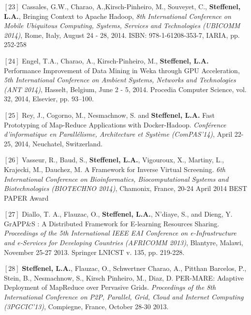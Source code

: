 \documentclass[final,twoside]{hdr} %
\begin{document}
\vspace{1em} \noindent $[23]$
Cassales, G.W., Charao, A.,Kirsch-Pinheiro, M., Souveyet, C., {\bf Steffenel, L.A.}, {Bringing Context to Apache Hadoop}, {\em 8th International Conference on Mobile Ubiquitous Computing, Systems, Services and Technologies (UBICOMM 2014)}, Rome, Italy, August 24 - 28, 2014. ISBN: 978-1-61208-353-7, IARIA, pp. 252-258 

\vspace{1em} \noindent $[24]$
Engel, T.A., Charao, A., Kirsch-Pinheiro, M., {\bf Steffenel, L.A.} {Performance Improvement of Data Mining in Weka through GPU Acceleration}, {\em 5th International Conference on Ambient Systems, Networks and Technologies (ANT 2014)}, Hasselt, Belgium, June 2 - 5, 2014. Procedia Computer Science, vol. 32, 2014, Elsevier, pp. 93–100.  

\vspace{1em} \noindent $[25]$
Rey, J., Cogorno, M., Nesmachnow, S. and {\bf Steffenel, L.A.} {Fast Prototyping of Map-Reduce Applications with Docker-Hadoop}. {\em Conférence d’informatique en Parallélisme, Architecture et Système (ComPAS'14)}, April 22-25, 2014, Neuchatel, Switzerland.

\vspace{1em} \noindent $[26]$
Vasseur, R., Baud, S., {\bf Steffenel, L.A.}, Vigouroux, X., Martiny, L., Krajecki, M., Dauchez, M. {A Framework for Inverse Virtual Screening}. {\em 6th International Conference on Bioinformatics, Biocomputational Systems and Biotechnologies (BIOTECHNO 2014)}, Chamonix, France, 20-24 April 2014 BEST PAPER Award

\vspace{1em} \noindent $[27]$
Diallo, T. A., Flauzac, O., {\bf Steffenel, L.A.}, N’diaye, S., and Dieng, Y. {GrAPP\&S : A Distributed Framework for E-learning Resources Sharing}. {\em Proceedings of the 5th International IEEE EAI Conference on e‐Infrastructure and e‐Services for Developing Countries (AFRICOMM 2013)}, Blantyre, Malawi, November 25-27 2013.  Springer LNICST v. 135, pp. 219-228. 

\vspace{1em} \noindent $[28]$
{\bf Steffenel, L.A.}, Flauzac, O., Schwertner Charao, A., Pitthan Barcelos, P., Stein, B., Nesmachnow, S., Kirsch Pinheiro, M., Diaz, D. {PER-MARE: Adaptive Deployment of MapReduce over Pervasive Grids}. {\em Proceedings of the 8th International Conference on P2P, Parallel, Grid, Cloud and Internet Computing (3PGCIC'13)}, Compiegne, France, October 28-30 2013. 
\end{document}
